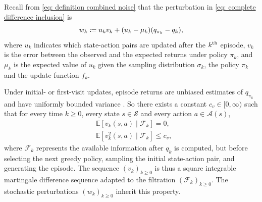 Recall from \eqref{eq: definition combined noise} that the perturbation in \eqref{eq: complete difference inclusion} is
\[
    w_k
    \coloneqq 
    u_k v_k + (u_k - \mu_k) ( q_{\pi_k} - q_k ) ,
\]
where $u_k$ indicates which state-action pairs are updated after the $k^{\textup{th}}$ episode, $v_k$ is the error between the observed and the expected returns under policy $\pi_k$, and $\mu_k$ is the expected value of $u_k$ given the sampling distribution $\sigma_k$, the policy $\pi_k$ and the update function $f_k$.

Under initial- or first-visit updates, episode returns are unbiased estimates of $q_{\pi_k}$ and have uniformly bounded variance \cite[Theorems~6~\&~8]{Singh1996ReinforcementTraces}.
So there exists a constant $c_v \in [0,\infty)$ such that for every time $k \ge 0$, every state $s \in \mathcal S$ and every action $a \in \mathcal A(s)$,
\begin{align}
\label{eq: v_mds_first}
&\mathbb E\!\left[v_k(s,a) \mid \mathcal F_k \right] = 0 ,
\\
\label{eq: v_mds_second}
&\mathbb E\!\left[v_k^2(s,a) \mid \mathcal F_k \right] \le c_v ,
\end{align}
where $\mathcal F_k$ represents the available information after $q_k$ is computed,
but before selecting the next greedy policy, sampling the initial state-action pair, and generating the episode.
The sequence $(v_k)_{k \ge 0}$ is thus a square integrable martingale difference sequence adapted to the filtration $(\mathcal F_{k})_{k \ge 0}$.
The stochastic perturbations $(w_k)_{k \ge 0}$ inherit this property.

